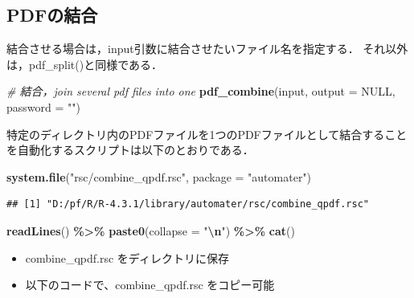 \documentclass[
]{article}
\newenvironment{Shaded}{\begin{snugshade}}{\end{snugshade}}
\newcommand{\AttributeTok}[1]{\textcolor[rgb]{0.13,0.29,0.53}{#1}}
\newcommand{\CommentTok}[1]{\textcolor[rgb]{0.56,0.35,0.01}{\textit{#1}}}
\newcommand{\ConstantTok}[1]{\textcolor[rgb]{0.56,0.35,0.01}{#1}}
\newcommand{\FunctionTok}[1]{\textcolor[rgb]{0.13,0.29,0.53}{\textbf{#1}}}
\newcommand{\NormalTok}[1]{#1}
\newcommand{\SpecialCharTok}[1]{\textcolor[rgb]{0.81,0.36,0.00}{\textbf{#1}}}
\newcommand{\StringTok}[1]{\textcolor[rgb]{0.31,0.60,0.02}{#1}}
\providecommand{\tightlist}{%
  \setlength{\itemsep}{0pt}\setlength{\parskip}{0pt}}
\begin{document}
\hypertarget{pdfux306eux7d50ux5408}{%
\subsection{PDFの結合}\label{pdfux306eux7d50ux5408}}

結合させる場合は，input引数に結合させたいファイル名を指定する．
それ以外は，pdf\_split()と同様である．

\begin{Shaded}
\begin{Highlighting}[]
  \CommentTok{\# 結合，join several pdf files into one}
\FunctionTok{pdf\_combine}\NormalTok{(input, }\AttributeTok{output =} \ConstantTok{NULL}\NormalTok{, }\AttributeTok{password =} \StringTok{""}\NormalTok{)}
\end{Highlighting}
\end{Shaded}

特定のディレクトリ内のPDFファイルを1つのPDFファイルとして結合することを自動化するスクリプトは以下のとおりである．

\begin{Shaded}
\begin{Highlighting}[]
\FunctionTok{system.file}\NormalTok{(}\StringTok{"rsc/combine\_qpdf.rsc"}\NormalTok{, }\AttributeTok{package =} \StringTok{"automater"}\NormalTok{)}
\end{Highlighting}
\end{Shaded}

\begin{verbatim}
## [1] "D:/pf/R/R-4.3.1/library/automater/rsc/combine_qpdf.rsc"
\end{verbatim}

\begin{Shaded}
\begin{Highlighting}[]
  \FunctionTok{readLines}\NormalTok{() }\SpecialCharTok{\%\textgreater{}\%}
  \FunctionTok{paste0}\NormalTok{(}\AttributeTok{collapse =} \StringTok{"}\SpecialCharTok{\textbackslash{}n}\StringTok{"}\NormalTok{) }\SpecialCharTok{\%\textgreater{}\%}
  \FunctionTok{cat}\NormalTok{()}
\end{Highlighting}
\end{Shaded}

\begin{itemize}
\tightlist
\item
  combine\_qpdf.rsc をディレクトリに保存\\
\item
  以下のコードで、combine\_qpdf.rsc をコピー可能
\end{itemize}
\end{document}
